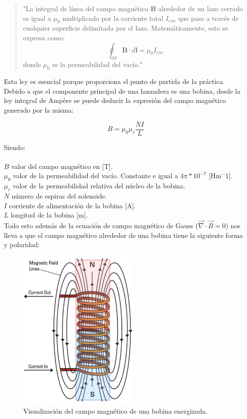 \begin{quote}
    "La integral de línea del campo magnético \(\mathbf{B}\) alrededor de un lazo cerrado es igual a \(\mu_0\) multiplicado por la corriente total \(I_{enc}\) que pasa a través de cualquier superficie delimitada por el lazo. Matemáticamente, esto se expresa como:
    \[
    \oint_{\partial S} \mathbf{B} \cdot d\mathbf{l} = \mu_0 I_{enc}
    \]
    donde \(\mu_0\) es la permeabilidad del vacío."
\end{quote}

Esta ley es esencial porque proporciona el punto de partida de la práctica. Debido a que el componente principal de una lanzadera es una bobina, desde la ley integral de Ampère se puede deducir la expresión del campo magnético generado por la misma:

\[B=\mu_0\mu_r\frac{NI}{L}\]

\noindent Siendo:\\
\\ \(B\) valor del campo magnético en [T].\\
\(\mu_0\) valor de la permeabilidad del vacío. Constante e igual a \(4\pi*10^{-7}\) [Hm\(^-1\)].\\
\(\mu_r\) valor de la permeabilidad relativa del núcleo de la bobina.\\
\(N\) número de espiras del solenoide.\\
\(I\) corriente de alimentación de la bobina [A].\\
\(L\) longitud de la bobina [m].\\

Todo esto además de la ecuación de campo magnético de Gauss (\(\vec{\nabla}\cdot\vec{B} = 0\)) nos lleva a que el campo magnético alrededor de una bobina tiene la siguiente forma y polaridad:

\begin{figure}[H]
    \centering %
    \includegraphics[width=6cm]{FigurasMemoria/electromagnet.png}
    \caption{Visualización del campo magnético de una bobina energizada.}
    \label{fig:electromagnet2} %
\end{figure}

